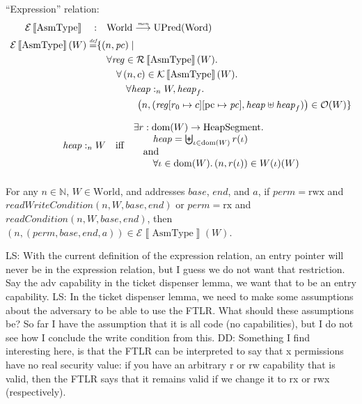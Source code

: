 \documentclass{article}
\newcommand{\forcenewline}{$\phantom{v}$\\}
\newcommand{\update}[2]{[#1 \mapsto #2]}
\newcommand{\sem}[1]{\left\llbracket #1 \right\rrbracket}
\newcommand{\monfun}{\stackrel{\textit{\tiny{mon}}}{\longrightarrow}}
\newcommand{\defeq}{\stackrel{\textit{\tiny{def}}}{=}}
\DeclareMathOperator{\dom}{dom}
\newcommand\lau[1]{{\color{purple} \sf \footnotesize {LS: #1}}}
\newcommand\dominique[1]{{\color{purple} \sf \footnotesize {DD: #1}}}
\newcommand{\var}[1]{\mathit{#1}}
\newcommand{\pc}{\mathit{pc}}
\newcommand{\pcreg}{\mathrm{pc}}
\newcommand{\reg}{\var{reg}}
\newcommand{\heap}{\var{heap}}
\newcommand{\perm}{\var{perm}}
\newcommand{\plainfun}[1]{\mathit{#1}}
\newcommand{\readCond}[1]{\plainfun{readCondition}(#1)}
\newcommand{\writeCond}[1]{\plainfun{readWriteCondition}(#1)}
\newcommand{\heapSat}[3][\heap]{#1 :_{#2} #3}
\newcommand{\asmType}{\plaindom{AsmType}}
\newcommand{\plaindom}[1]{\mathrm{#1}}
\newcommand{\Words}{\plaindom{Word}}
\newcommand{\HeapSegments}{\plaindom{HeapSegment}}
\newcommand{\nats}{\mathbb{N}}
\newcommand{\Worlds}{\plaindom{World}}
\newcommand{\UPred}[1]{\plaindom{UPred}(#1)}
\newcommand{\intr}[2]{\mathcal{#1}\sem{#2}}
\newcommand{\exprintr}[1]{\intr{E}{#1}}
\newcommand{\contintr}[1]{\intr{K}{#1}}
\newcommand{\regintr}[1]{\intr{R}{#1}}
\newcommand{\stder}{\exprintr{\asmType}}
\newcommand{\stdrr}{\regintr{\asmType}}
\newcommand{\stdkr}{\contintr{\asmType}}
\newcommand{\observations}{\mathcal{O}}
\newcommand{\npair}[2][n]{\left(#1,#2 \right)}
\newcommand{\plainperm}[1]{\mathrm{#1}}
\newcommand{\exec}{\plainperm{rx}}
\newcommand{\rwx}{\plainperm{rwx}}
\begin{document}
``Expression'' relation:
\begin{align*}
  \stder \quad : & \quad \Worlds \monfun \UPred{\Words} \\%
  \stder(W) \defeq & \{ \npair{\pc} \mid \\
                   & \quad \forall \reg \in \stdrr(W) \ldotp \\
                   & \qquad \forall \npair{c} \in \stdkr(W) \ldotp \\
                   & \qquad \quad  \forall \heapSat{n}{W}, \heap_f \ldotp \\
                   & \qquad \qquad \npair{(\reg\update{r_0}{c}\update{\pcreg}{\pc},\heap \uplus \heap_f)} \in \observations(W) \}
\end{align*}

\begin{definition}
\begin{align*}
  \heapSat{n}{W} & & \text{iff} & &
                                      \arraycolsep=0pt
                                      \begin{array}{l}
                                      \exists r: \dom(W) \rightarrow \HeapSegments \ldotp \\
                                      \qquad\heap = \biguplus_{\iota\in \dom(W)} r(\iota)\\
                                      \quad\text{and}\\
                                      \qquad\forall \iota \in \dom(W) \ldotp \npair{r(\iota)} \in W(\iota)(W)
                                      \end{array}\\
\end{align*}

\end{definition}
\begin{lemma} \forcenewline
  For any $n \in \nats$, $W \in \Worlds$, and addresses $\var{base}$, $\var{end}$, and $a$, if $\perm = \rwx$ and $\writeCond{n,W,\var{base},\var{end}}$ or $\perm = \exec$ and $\readCond{n,W,\var{base},\var{end}}$, then $\npair{(\perm, \var{base}, \var{end}, a)} \in \stder(W)$.
\end{lemma} %
\lau{With the current definition of the expression relation, an entry pointer will never be in the expression relation, but I guess we do not want that restriction. Say the adv capability in the ticket dispenser lemma, we want that to be an entry capability.}
\lau{In the ticket dispenser lemma, we need to make some assumptions about the adversary to be able to use the FTLR. What should these assumptions be? So far I have the assumption that it is all code (no capabilities), but I do not see how I conclude the write condition from this.}
\dominique{Something I find interesting here, is that the FTLR can be interpreted to say that x permissions have no real security value: if you have an arbitrary r or rw capability that is valid, then the FTLR says that it remains valid if we change it to rx or rwx (respectively).}
\end{document}
